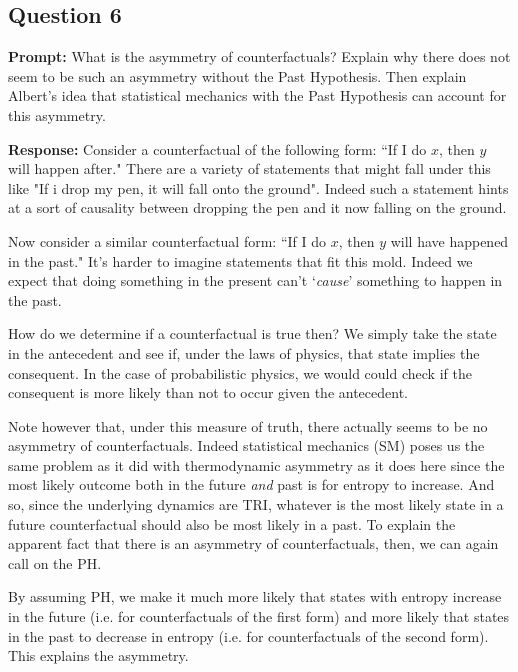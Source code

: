 \documentclass{article}
\begin{document}
\subsection*{Question 6}
\noindent\textbf{Prompt:} What is the asymmetry of counterfactuals? Explain why there does not seem to be such an asymmetry without the Past Hypothesis. Then explain Albert’s idea that statistical mechanics with the Past Hypothesis can account for this asymmetry.
\bigskip

\noindent\textbf{Response:} Consider a counterfactual of the following form: ``If I do $x$, then $y$ will happen after." There are a variety of statements that might fall under this like "If i drop my pen, it will fall onto the ground". Indeed such a statement hints at a sort of causality between dropping the pen and it now falling on the ground. 

Now consider a similar counterfactual form: ``If I do $x$, then $y$ will have happened in the past." It's harder to imagine statements that fit this mold. Indeed we expect that doing something in the present can't `\textit{cause}' something to happen in the past.


How do we determine if a counterfactual is true then? We simply take the state in the antecedent and see if, under the laws of physics, that state implies the consequent. In the case of probabilistic physics, we would could check if the consequent is more likely than not to occur given the antecedent.

Note however that, under this measure of truth, there actually seems to be no asymmetry of counterfactuals. Indeed statistical mechanics (SM) poses us the same problem as it did with thermodynamic asymmetry as it does here since the most likely outcome both in the future \textit{and} past is for entropy to increase. And so, since the underlying dynamics are TRI, whatever is the most likely state in a future counterfactual should also be most likely in a past. To explain the apparent fact that there is an asymmetry of counterfactuals, then, we can again call on the PH.

By assuming PH, we make it much more likely that states with entropy increase in the future (i.e. for counterfactuals of the first form) and more likely that states in the past to decrease in entropy (i.e. for counterfactuals of the second form). This explains the asymmetry.
\end{document}
